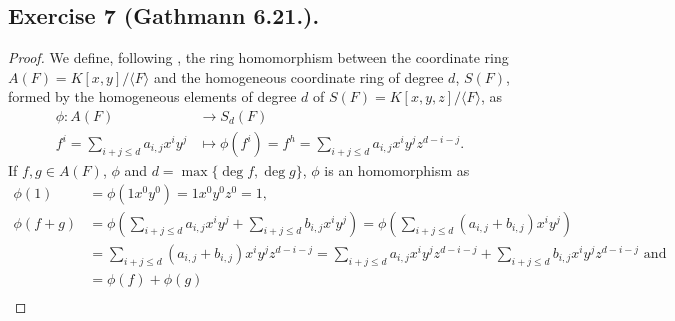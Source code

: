 \documentclass[11pt,a4paper]{article}
\begin{document}
\subsection*{Exercise 7 (Gathmann 6.21.).}
\begin{proof}
We define, following \cite[Construction 3.13]{gath}, the ring homomorphism between the coordinate ring $ A(F) = K[x, y] / \langle F \rangle $ and the homogeneous coordinate ring of degree $ d $, $ S(F)$, formed by the homogeneous elements of degree $ d $ of $ S(F) = K[x, y, z] / \langle F \rangle$, as
  \begin{align*}
    \phi: A(F) &\longrightarrow S_d(F) \\
    f^i = \sum_{i+j \leq d} a_{i,j} x^i y^j &\longmapsto \phi (f^i) = f^h = \sum_{i+j \leq d} a_{i,j} x^i y^j z^{d-i-j}.
  \end{align*}
  If $f, g \in A(F) $, $\phi $ and $ d = \operatorname{max}\{\operatorname{deg}f, \operatorname{deg}g\} $, $\phi$ is an homomorphism as
  \begin{align*}
    \phi(1) &= \phi(1 x^0 y^0) = 1 x^0 y^0 z^0 = 1, \\
    \phi(f + g) &= \phi \left(\sum_{i + j \leq d} a_{i,j} x^i y^j + \sum_{i + j \leq d} b_{i,j} x^i y^j \right) = \phi \left(\sum_{i + j \leq d} (a_{i,j} + b_{i,j})  x^i y^j \right) \\
    &= \sum_{i + j \leq d} (a_{i,j} + b_{i,j})  x^i y^j z^{d-i-j} = \sum_{i + j \leq d} a_{i,j}  x^i y^j z^{d-i-j} + \sum_{i + j \leq d} b_{i,j}  x^i y^j z^{d-i-j} \text{ and} \\
    &= \phi(f) + \phi(g)\\ 
  \end{align*}


\end{proof}
\end{document}
